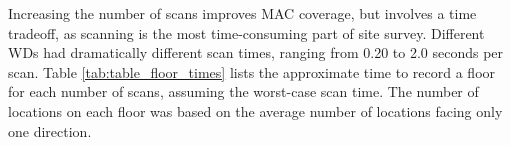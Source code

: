 \documentclass[conference]{IEEEtran}
\begin{document}
\indent Increasing the number of scans improves MAC coverage, but involves a time tradeoff, as scanning is the most time-consuming part of site survey. Different WDs had dramatically different scan times, ranging from 0.20 to 2.0 seconds per scan. Table \ref{tab:table_floor_times} lists the approximate time to record a floor for each number of scans, assuming the worst-case scan time. The number of locations on each floor was based on the average number of locations facing only one direction.

\begin{table}[!t]
\renewcommand{\arraystretch}{1.3}
\caption{MAC Coverage by Scan Numbers}
\label{tab:MAC_accuracy}
\centering
{}
\end{table}
\end{document}
